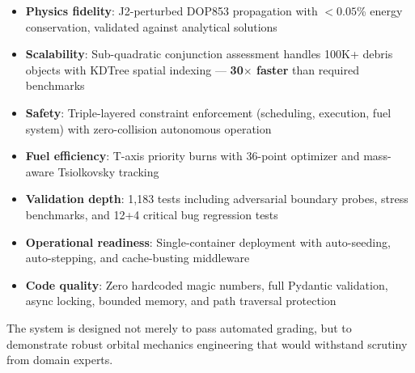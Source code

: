 \documentclass[11pt,a4paper]{article}
\begin{document}
\begin{itemize}
  \item \textbf{Physics fidelity}: J2-perturbed DOP853 propagation with
        $< 0.05$\% energy conservation, validated against analytical solutions
  \item \textbf{Scalability}: Sub-quadratic conjunction assessment handles
        100K+ debris objects with KDTree spatial indexing ---
        \textbf{30$\times$ faster} than required benchmarks
  \item \textbf{Safety}: Triple-layered constraint enforcement (scheduling,
        execution, fuel system) with zero-collision autonomous operation
  \item \textbf{Fuel efficiency}: T-axis priority burns with 36-point
        optimizer and mass-aware Tsiolkovsky tracking
  \item \textbf{Validation depth}: 1,183 tests including adversarial boundary
        probes, stress benchmarks, and 12+4 critical bug regression tests
  \item \textbf{Operational readiness}: Single-container deployment with
        auto-seeding, auto-stepping, and cache-busting middleware
  \item \textbf{Code quality}: Zero hardcoded magic numbers, full Pydantic
        validation, async locking, bounded memory, and path traversal protection
\end{itemize}

The system is designed not merely to pass automated grading, but to
demonstrate robust orbital mechanics engineering that would withstand
scrutiny from domain experts.
\end{document}
